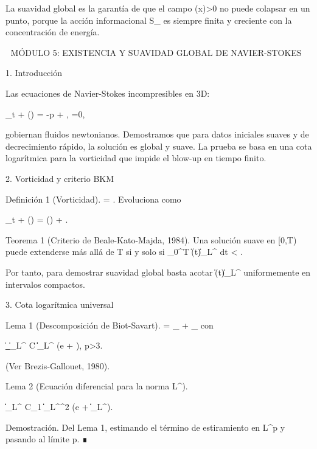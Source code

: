 \documentclass[12pt,a4paper]{book}
\begin{document}
La suavidad global es la garantía de que el campo \rho(x)>0 no puede colapsar en un punto, porque la acción informacional S_{} es siempre finita y creciente con la concentración de energía.

🧬 MÓDULO 5: EXISTENCIA Y SUAVIDAD GLOBAL DE NAVIER-STOKES

1. Introducción

Las ecuaciones de Navier-Stokes incompresibles en 3D:

\partial_t  + (\cdot\nabla) = -\nabla p + \nu \Delta {}, \quad \nabla\cdot{}=0,

gobiernan fluidos newtonianos. Demostramos que para datos iniciales suaves y de decrecimiento rápido, la solución es global y suave. La prueba se basa en una cota logarítmica para la vorticidad que impide el blow-up en tiempo finito.

2. Vorticidad y criterio BKM

Definición 1 (Vorticidad). \boldsymbol{\omega} = \nabla \times {}. Evoluciona como

\partial_t \boldsymbol{\omega} + (\cdot\nabla)\boldsymbol{\omega} = (\boldsymbol{\omega}\cdot\nabla) + \nu \Delta \boldsymbol{\omega}.

Teorema 1 (Criterio de Beale-Kato-Majda, 1984). Una solución suave en [0,T) puede extenderse más allá de T si y solo si \int_0^T \|\boldsymbol{\omega}(t)\|_{L^\infty} dt < \infty.

Por tanto, para demostrar suavidad global basta acotar \|\boldsymbol{\omega}(t)\|_{L^\infty} uniformemente en intervalos compactos.

3. Cota logarítmica universal

Lema 1 (Descomposición de Biot-Savart).  = _{} + _{} con

\|\nabla {}_{}\|_{L^\infty} \le C \|\boldsymbol{\omega}\|_{L^\infty} \log\left(e + \right), \quad p>3.

(Ver Brezis-Gallouet, 1980).

Lema 2 (Ecuación diferencial para la norma L^\infty).

\|\boldsymbol{\omega}\|_{L^\infty} \le C_1 \|\boldsymbol{\omega}\|_{L^\infty}^2 \log(e + \|\boldsymbol{\omega}\|_{L^\infty}).

Demostración. Del Lema 1, estimando el término de estiramiento en L^p y pasando al límite p\to\infty. ∎
\end{document}
